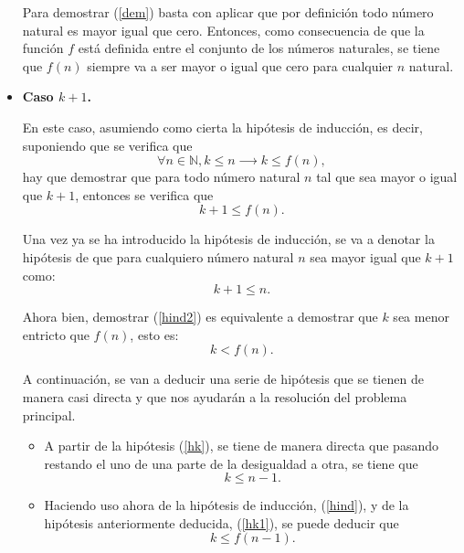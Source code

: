 \begin{demostracion}
\begin{itemize}
      Para demostrar (\ref{dem}) basta con aplicar que por
      definición todo número natural es mayor igual que cero.
      Entonces, como consecuencia de que la función \(f\) está
      definida entre el conjunto de los números naturales, se tiene
      que \(f(n)\) siempre va a ser mayor o igual que cero para
      cualquier \(n\) natural.
      
    \item \textbf{Caso \(k+1\).}
    
      En este caso, asumiendo como cierta la hipótesis de inducción,
      es decir, suponiendo que se verifica que
      \begin{equation}\label{hind}\tag{h\(\_\)ind}
        ∀ n ∈ ℕ, k≤ n ⟶ k ≤ f(n),
      \end{equation}
      hay que demostrar que para todo número natural \(n\) tal que
      sea mayor o igual que \(k+1\), entonces se verifica que
      \begin{equation}\label{hind2}
        k+1 ≤ f(n).
      \end{equation}

      Una vez ya se ha introducido la hipótesis de inducción, se va
      a denotar la hipótesis de que para cualquiero número natural
      \(n\) sea mayor igual que \(k+1\) como:
      \begin{equation}\label{hk}\tag{hk}
        k+1≤n.
      \end{equation}

      Ahora bien, demostrar (\ref{hind2}) es equivalente a demostrar
      que \(k\) sea menor entricto que \(f(n)\), esto es:
      \begin{equation}\label{hind3}
        k<f(n).
      \end{equation}

      A continuación, se van a deducir una serie de hipótesis que se
      tienen de manera casi directa y que nos ayudarán a la
      resolución del problema principal.
      \begin{itemize}
      \item A partir de la hipótesis (\ref{hk}), se tiene de manera
        directa que pasando restando el uno de una parte de la
        desigualdad a otra, se tiene que
        \begin{equation}\label{hk1}\tag{hk1}
          k≤n-1.
        \end{equation}
        
      \item Haciendo uso ahora de la hipótesis de inducción,
        (\ref{hind}), y de la hipótesis anteriormente deducida,
        (\ref{hk1}), se puede deducir que
        \begin{equation}\label{hk2}\tag{hk2}
          k≤f(n-1).
        \end{equation}


\end{itemize}
\end{itemize}
\end{demostracion}
